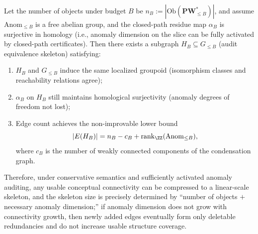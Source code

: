 \begin{conclusion}\label{con:xi-connectivity-minimal-skeleton-linear-size}
Let the number of objects under budget \(B\) be \(n_B:=|\mathrm{Ob}(\mathbf{PW}^{\ast}_{\le B})|\), and assume \(\mathrm{Anom}_{\le B}\) is a free abelian group, and the closed-path residue map \(\alpha_B\) is surjective in homology (i.e., anomaly dimension on the slice can be fully activated by closed-path certificates).
Then there exists a subgraph \(H_B\subseteq G_{\le B}\) (audit equivalence skeleton) satisfying:
\begin{enumerate}
  \item \(H_B\) and \(G_{\le B}\) induce the same localized groupoid (isomorphism classes and reachability relations agree); \label{item:xi-skel-groupoid}
  \item \(\alpha_B\) on \(H_B\) still maintains homological surjectivity (anomaly degrees of freedom not lost); \label{item:xi-skel-anom}
  \item Edge count achieves the non-improvable lower bound
  \[
  |E(H_B)| = n_B - c_B + \mathrm{rank}_{\ZZ}(\mathrm{Anom}_{\le B}),
  \]
  where \(c_B\) is the number of weakly connected components of the condensation graph. \label{item:xi-skel-size}
\end{enumerate}
Therefore, under conservative semantics and sufficiently activated anomaly auditing, any usable conceptual connectivity can be compressed to a linear-scale skeleton, and the skeleton size is precisely determined by ``number of objects \(+\) necessary anomaly dimension;'' if anomaly dimension does not grow with connectivity growth, then newly added edges eventually form only deletable redundancies and do not increase usable structure coverage.
\end{conclusion}

